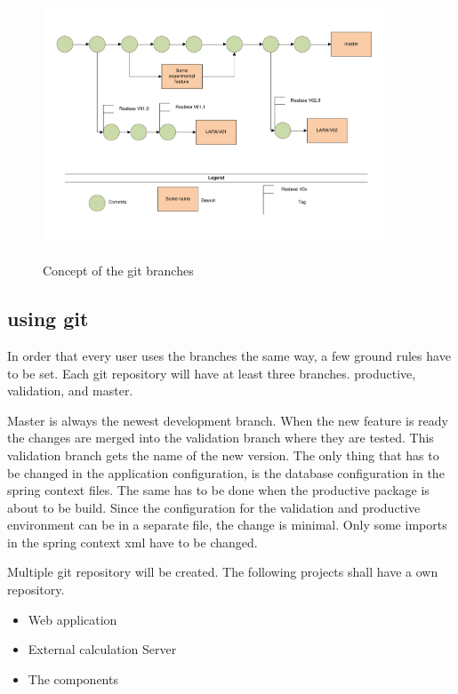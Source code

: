 \documentclass[paper=a4,twoside=false,BCOR=0mm,DIV=calc,fontsize=12pt]{scrartcl}
\begin{document}
\begin{figure}
    \begin{center}
       \includegraphics[width=0.9\textwidth]{./img/gitversioning.pdf}\\
    \end{center}
  \caption{Concept of the git branches}
  \label{gitbranchconcept}
\end{figure} 

\subsection{using git}
In order that every user uses the branches the same way, a few ground rules have to be set.
Each git repository will have at least three branches. productive, validation, and master.

Master is always the newest development branch. When the new feature is ready the changes are merged into the validation branch where they are tested. This validation branch gets the name of the new version.
The only thing that has to be changed in the application configuration, is the database configuration in the spring context files.
The same has to be done when the productive package is about to be build. Since the configuration for the validation and productive 
environment can be in a separate file, the change is minimal. Only some imports in the spring context xml have to be changed.

Multiple git repository will be created. The following projects shall have a own repository.
\begin{itemize}
 \item Web application
 \item External calculation Server
 \item The components
\end{itemize}
\end{document}
